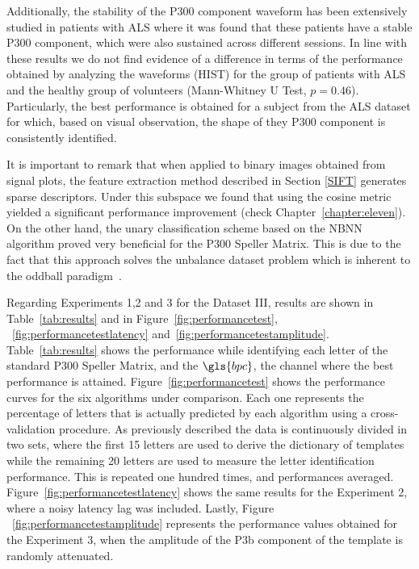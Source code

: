 Additionally, the stability of the P300 component waveform has been extensively studied in patients with ALS \cite{SellersandEmanuelDonchin2006,TomohiroMadarame2008,Nijboer2009,Mak2012,McCane2015} where it was found that these patients have a stable P300 component, which were also sustained across different sessions.  In line with these results we do not find evidence of a difference in terms of the performance obtained by analyzing the waveforms (HIST) for the group of patients with ALS and the healthy group of volunteers (Mann-Whitney U Test, $p=0.46$). Particularly, the best performance is obtained for a subject from the ALS dataset for which, based on visual observation, the shape of they P300 component is consistently identified.


It is important to remark that when applied to binary images obtained from signal plots, the feature extraction method described in Section \ref{SIFT} generates sparse descriptors.  Under this subspace we found that using the cosine metric yielded a significant performance improvement (check Chapter~\ref{chapter:eleven}). On the other hand, the unary classification scheme based on the NBNN algorithm proved very beneficial for the P300 Speller Matrix.  This is due to the fact that this approach solves the unbalance dataset problem which is inherent to the oddball paradigm~\cite{Tibon2015}.  



Regarding Experiments 1,2 and 3 for the Dataset III, results are shown in Table~\ref{tab:results} and in Figure~\ref{fig:performancetest}, ~\ref{fig:performancetestlatency} and~\ref{fig:performancetestamplitude}.  Table~\ref{tab:results} shows the  performance while identifying each letter of the standard P300 Speller Matrix, and the $\gls{bpc}$, the channel where the best performance is attained.   Figure~\ref{fig:performancetest} shows the performance curves for the six algorithms under comparison.  Each one represents the percentage of letters that is actually predicted by each algorithm using a cross-validation procedure.  As previously described the data is continuously divided in two sets, where the first 15 letters are used to derive the dictionary of templates while the remaining 20 letters are used to measure the letter identification performance. This is repeated one hundred times, and performances averaged.   Figure~\ref{fig:performancetestlatency} shows the same results for the Experiment 2, where a noisy latency lag was included.   Lastly, Figure ~\ref{fig:performancetestamplitude} represents the performance values obtained for the Experiment 3, when the amplitude of the P3b component of the template is randomly attenuated.  


